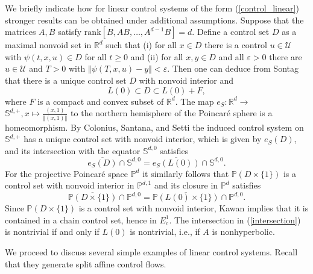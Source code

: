 	We briefly indicate how for linear control systems of the form
	(\ref{control_linear}) stronger results can be obtained under additional
	assumptions. Suppose that the matrices $A,B$ satisfy $\mathrm{rank}%
	[B,AB,\ldots,A^{d-1}B]=d$. Define a control set $D$ as a maximal nonvoid set
	in $\mathbb{R}^{d}$ such that (i) for all $x\in D$ there is a control
	$u\in\mathcal{U}$ with $\psi(t,x,u)\in D$ for all $t\geq0$ and (ii) for all
	$x,y\in D$ and all $\varepsilon>0$ there are $u\in\mathcal{U}$ and $T>0$ with
	$\left\Vert \psi(T,x,u)-y\right\Vert <\varepsilon$. Then one can deduce from
	Sontag \cite[Corollary 3.6.7]{Son98} that there is a unique control set $D$
	with nonvoid interior and
	\[
	L(0)\subset D\subset L(0)+F,
	\]
	where $F$ is a compact and convex subset of $\mathbb{R}^{d}$. The map
	$e_{S}:\mathbb{R}^{d}\rightarrow$ $\mathbb{S}^{d,+},x\mapsto\frac
	{(x,1)}{\left\Vert (x,1)\right\Vert }$ to the northern hemisphere of the
	Poincar\'{e} sphere is a homeomorphism. By Colonius, Santana, and Setti
	\cite[Theorem 15(ii)]{ColSS23b} the induced control system on $\mathbb{S}%
	^{d,+}$ has a unique control set with nonvoid interior, which is given by
	$e_{S}(D)$, and its intersection with the equator $\mathbb{S}^{d,0}$
	satisfies
	\begin{equation}
		\overline{e_{S}(D)}\cap\mathbb{S}^{d,0}=\overline{e_{S}(L(0))}\cap
		\mathbb{S}^{d,0}. \label{intersection}%
	\end{equation}
	For the projective Poincar\'{e} space $\mathbb{P}^{d}$ it similarly follows
	that $\mathbb{P}\left(  D\times\{1\}\right)  $ is a control set with nonvoid
	interior in $\mathbb{P}^{d,1}$ and its closure in $\mathbb{P}^{d}$ satisfies
	\[
	\overline{\mathbb{P}\left(  D\times\{1\}\right)  }\cap\mathbb{P}%
	^{d,0}=\overline{\mathbb{P}(L(0)\times\{1\})}\cap\mathbb{P}^{d,0}.
	\]
	Since $\mathbb{P}\left(  D\times\{1\}\right)  $ is a control set with nonvoid
	interior, Kawan \cite[Proposition 1.24(ii)]{Kawa13} implies that it is
	contained in a chain control set, hence in $E_{c}^{1}$. The intersection in
	(\ref{intersection}) is nontrivial if and only if $L(0)$ is nontrivial, i.e.,
	if $A$ is nonhyperbolic.
	
	We proceed to discuss several simple examples of linear control systems.
	Recall that they generate split affine control flows.
	
